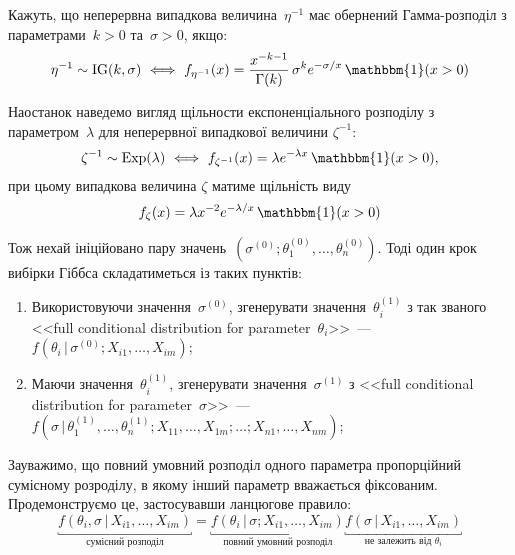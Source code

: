 Кажуть, що неперервна випадкова величина~$\eta^{-1}$ має обернений Гамма-розподіл з параметрами~$k>0$ та~$\sigma>0$, якщо:
\begin{equation}\label{task 5 - eq: dIG}
    \eta^{-1} \sim \mathrm{IG}(k,\sigma) \ \Longleftrightarrow \ f_{\eta^{-1}}(x) = \frac{x^{-k-1}}{\Gamma(k)}\,\sigma^{k} e^{-\sigma/x}\, \mathbbm{1}(x>0)
\end{equation}

Наостанок наведемо вигляд щільности експоненціального розподілу з параметром~$\lambda$ для неперервної випадкової величини $\zeta^{-1}:$
\begin{equation}\label{task 5 - eq: dExp}
    \zeta^{-1} \sim \mathrm{Exp}(\lambda) \ \Longleftrightarrow \ f_{\zeta^{-1}}(x) = \lambda e^{-\lambda x}\, \mathbbm{1}(x>0),
\end{equation}
при цьому випадкова величина $\zeta$ матиме щільність виду
\begin{equation}\label{task 5 - eq: dInvExp}
    f_{\zeta}(x) = \lambda x^{-2} e^{-\lambda/x}\, \mathbbm{1}(x>0)
\end{equation}

Тож нехай ініційовано пару значень~$\left( \sigma^{(0)};\theta_1^{(0)},\ldots,\theta_n^{(0)} \right)$. Тоді один крок вибірки Гіббса складатиметься із таких пунктів:
\begin{enumerate}
    \item Використовуючи значення~$\sigma^{(0)}$, згенерувати значення~$\theta_i^{(1)}$ з так званого <<full conditional distribution for parameter~$\theta_i$>>~--- $f(\theta_i \,|\, \sigma^{(0)}; X_{i1},\ldots,X_{im})$; 
    \item Маючи значення~$\theta_i^{(1)}$, згенерувати значення~$\sigma^{(1)}$ з <<full conditional distribution for parameter~$\sigma$>>~--- $f(\sigma \,|\, \theta_1^{(1)},\ldots,\theta_n^{(1)}; X_{11},\ldots,X_{1m};\ldots;X_{n1},\ldots,X_{nm})$; 
\end{enumerate}

Зауважимо, що повний умовний розподіл одного параметра пропорційний сумісному розроділу, в якому інший параметр вважається фіксованим. Продемонструємо це, застосувавши ланцюгове правило:
\begin{equation}\label{task 5 - eq: full theta conditional distribution}
    \underbracket{f(\theta_i, \sigma \,|\, X_{i1},\ldots,X_{im})}_{\text{сумісний розподіл}} = \underbracket{f(\theta_i \,|\, \sigma; X_{i1},\ldots,X_{im})}_{\text{повний умовний розподіл}} \underbracket{f(\sigma \,|\, X_{i1},\ldots,X_{im})}_{\text{не залежить від $\theta_i$}}
\end{equation}

